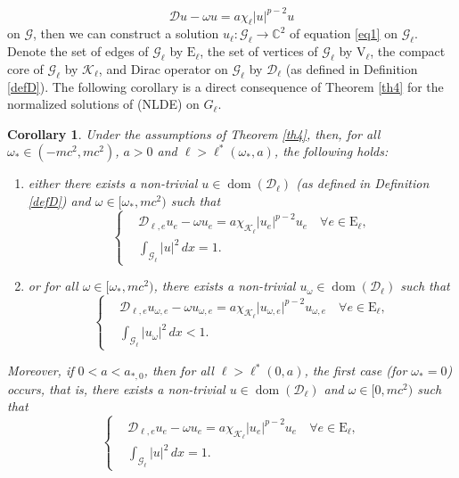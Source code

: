 \documentclass[11pt]{amsart}
\newtheorem{corollary}[theorem]{Corollary}
\newcommand{\abs}[1]{\lvert#1\rvert}
\newcommand{\D}{\mathcal{D}}
\newcommand{\G}{\mathcal{G}}
\newcommand{\K}{\mathcal{K}}
\numberwithin{equation}{section}
\begin{document}
\begin{equation}\label{eqell}
    \D u - \omega u= a\chi_\ell\abs{u}^{p-2}u
\end{equation}
on $\G$, then we can construct a solution $u_\ell:\G_\ell \to \mathbb{C}^2$ of equation \eqref{eq1} on $\G_\ell$.  Denote the set of edges of $\G_\ell$ by $\mathrm{E}_\ell$, the set of vertices of $\G_\ell$ by $\mathrm{V}_\ell$, the compact core of $\G_\ell$ by $\K_\ell$, and Dirac operator on $\G_\ell$ by $\D_\ell$ (as defined in Definition \ref{defD}). The following corollary is a direct consequence of Theorem \ref{th4} for the normalized solutions of (NLDE) on $G_\ell$.

\begin{corollary}\label{co1}
    Under the assumptions of Theorem \ref{th4}, then, for all $\omega_*\in(-mc^2, mc^2)$, $a > 0$ and $\ell>\ell^*(\omega_*,a)$, the following holds:\\
    \begin{enumerate}[label=\rm(\roman*)]
        \item either there exists a non-trivial $u \in \operatorname{dom}(\D_\ell)$ (as defined in Definition \ref{defD}) and $\omega \in [\omega_*, mc^2)$ such that
    \begin{equation*}
    \left\{\begin{aligned}
        &\D_{\ell,e} u_e - \omega u_e= a\chi_{\K_\ell}\abs{u_e}^{p-2}u_e \quad \forall e\in \mathrm{E}_\ell,\\
        &\int_{\G_\ell}\abs{u}^2\,dx = 1.
    \end{aligned}
    \right.
    \end{equation*}
    \item  or for all $\omega \in [\omega_*, mc^2)$, there exists a non-trivial $u_\omega \in \operatorname{dom}(\D_\ell)$ such that
    \begin{equation*}
    \left\{\begin{aligned}
        &\D_{\ell,e} u_{\omega,e} - \omega u_{\omega,e} = a\chi_{\K_\ell}\abs{u_{\omega,e}}^{p-2}u_{\omega,e} \quad\forall e\in \mathrm{E}_\ell,\\
        &\int_{\G_\ell}\abs{u_\omega}^2\,dx < 1.
    \end{aligned}
    \right.
    \end{equation*}
    \end{enumerate}
Moreover, if $0<a<a_{*,0}$, then for all $\ell>\ell^*(0,a)$, the first case (for $\omega_* =0$) occurs, that is, there exists a non-trivial $u \in \operatorname{dom}(\D_\ell)$ and $\omega \in [0, mc^2)$ such that
    \begin{equation*}
    \left\{\begin{aligned}
        &\D_{\ell,e} u_e - \omega u_e= a\chi_{\K_\ell}\abs{u_e}^{p-2}u_e \quad \forall e\in \mathrm{E}_\ell,\\
        &\int_{\G_\ell}\abs{u}^2\,dx = 1.
    \end{aligned}
    \right.
    \end{equation*}
\end{corollary}
\end{document}
